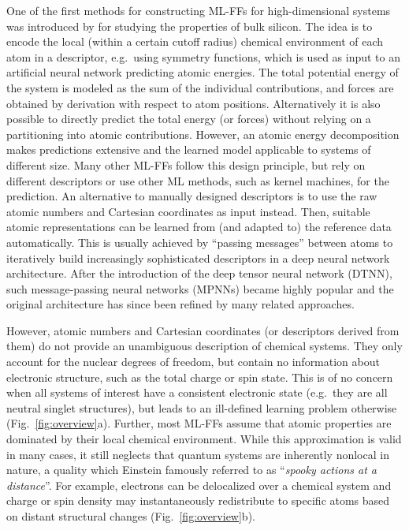 \documentclass[%
superscriptaddress,
reprint,
nofootinbib,
amsmath,amssymb,amsfonts,
floatfix,
altaffilletter,
showkeys,
]{revtex4-2}
\begin{document}
One of the first methods for constructing ML-FFs for high-dimensional systems was introduced by \citeauthor{behler2007generalized} for studying the properties of bulk silicon.\cite{behler2007generalized} The idea is to encode the local (within a certain cutoff radius) chemical environment of each atom in a descriptor, e.g.\ using symmetry functions,\cite{behler2011atom} which is used as input to an artificial neural network\cite{mcculloch1943logical} predicting atomic energies. The total potential energy of the system is modeled as the sum of the individual contributions, and forces are obtained by derivation with respect to atom positions. Alternatively it is also possible to directly predict the total energy (or forces) without relying on a partitioning into atomic contributions.\cite{unke2017toolkit,chmiela2017machine,chmiela2019sgdml} However, an atomic energy decomposition makes predictions extensive and the learned model applicable to systems of different size. Many other ML-FFs follow this design principle, but rely on different descriptors\cite{smith2017ani,zhang2018deep,unke2018reactive} or use other ML methods,\cite{bartok2010gaussian,bartok2017machine,christensen2020fchl} such as kernel machines,\cite{vapnik1995,cortes1995support,muller2001introduction,scholkopf2002learning,braun2008relevant,rupp2012fast,hansen2013assessment} for the prediction. An alternative to manually designed descriptors is to use the raw atomic numbers and Cartesian coordinates as input instead. Then, suitable atomic representations can be learned from (and adapted to) the reference data automatically. This is usually achieved by ``passing messages'' between atoms to iteratively build increasingly sophisticated descriptors in a deep neural network architecture. After the introduction of the deep tensor neural network (DTNN),\cite{schutt2017quantum} such message-passing neural networks (MPNNs)\cite{gilmer2017neural} became highly popular and the original architecture has since been refined by many related approaches.\cite{schutt2018schnet,lubbers2018hierarchical,unke2019physnet}

However, atomic numbers and Cartesian coordinates (or descriptors derived from them) do not provide an unambiguous description of chemical systems.\cite{friesner2005ab} They only account for the nuclear degrees of freedom, but contain no information about electronic structure, such as the total charge or spin state. This is of no concern when all systems of interest have a consistent electronic state (e.g.\ they are all neutral singlet structures), but leads to an ill-defined learning problem otherwise (Fig.~\ref{fig:overview}a). Further, most ML-FFs assume that atomic properties are dominated by their local chemical environment.\cite{unke2020machine} While this approximation is valid in many cases, it still neglects that quantum systems are inherently nonlocal in nature, a quality which Einstein famously referred to as ``\emph{spooky actions at a distance}''.\cite{born2005born} For example, electrons can be delocalized over a chemical system and charge or spin density may instantaneously redistribute to specific atoms based on distant structural changes (Fig.~\ref{fig:overview}b).\cite{noodleman1995orbital,dreuw2003long,duda2006resonant,bellec2010nonlocal,bostrom2018charge}
\end{document}
